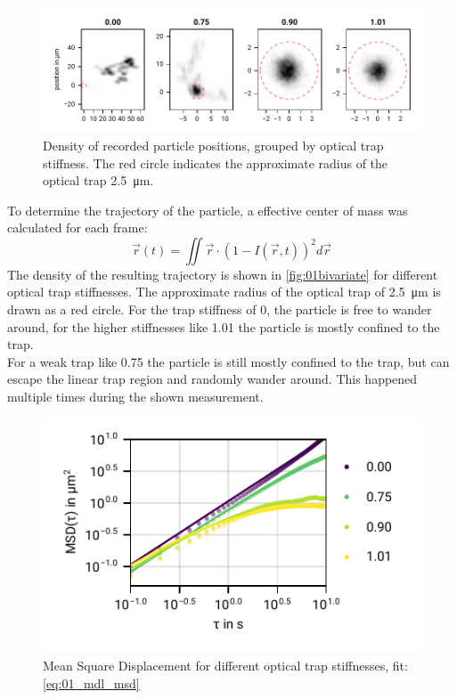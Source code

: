 \documentclass[
    twoside=false,
    twocolumn=true,
    fontsize=11pt,
]{scrarticle}
\begin{document}
\begin{figure}
    \centering
    \includegraphics{figures/01_03_1_bivariate.pdf}
    \caption{Density of recorded particle positions, grouped by optical trap stiffness. The red circle indicates the approximate radius of the optical trap \SI{2.5}{\micro m}.}
    \label{fig:01bivariate}
\end{figure}
To determine the trajectory of the particle, a effective center of mass was calculated for each frame:
\begin{equation}
    \vec{r}(t) = \iint \vec{r} \cdot \left(1-I(\vec{r}, t)\right)^2 d\vec{r}    
\end{equation}
The density of the resulting trajectory is shown in \autoref{fig:01bivariate} for different optical trap stiffnesses.
The approximate radius of the optical trap of \SI{2.5}{\micro m} is drawn as a red circle.
For the trap stiffness of \SI{0}{}, the particle is free to wander around, for the higher stiffnesses like \SI{1.01}{} the particle is mostly confined to the trap.\\
For a weak trap like \SI{0.75}{} the particle is still mostly confined to the trap, but can escape the linear trap region and randomly wander around. 
This happened multiple times during the shown measurement.

\begin{figure}
    \centering
    \includegraphics{figures/01_02_2_msd.pdf}
    \caption{Mean Square Displacement for different optical trap stiffnesses, fit: \autoref{eq:01_mdl_msd}}
    \label{fig:01msd}
\end{figure}
\end{document}
